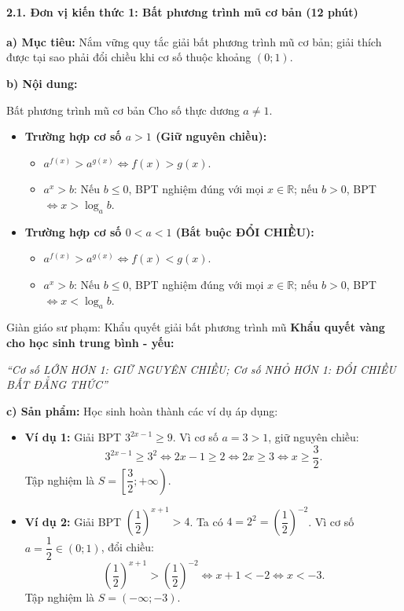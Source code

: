 \documentclass[12pt, a4paper]{article}
\begin{document}
\paragraph{2.1. Đơn vị kiến thức 1: Bất phương trình mũ cơ bản (12 phút)}

\noindent \textbf{a) Mục tiêu:}
Nắm vững quy tắc giải bất phương trình mũ cơ bản; giải thích được tại sao phải đổi chiều khi cơ số thuộc khoảng $(0; 1)$.

\noindent \textbf{b) Nội dung:}
\begin{pedabox}{Bất phương trình mũ cơ bản}
Cho số thực dương $a \neq 1$.
\begin{itemize}[leftmargin=0.6cm]
    \item \textbf{Trường hợp cơ số $a > 1$ (Giữ nguyên chiều):}
    \begin{itemize}
        \item $a^{f(x)} > a^{g(x)} \iff f(x) > g(x)$.
        \item $a^x > b$: Nếu $b \le 0$, BPT nghiệm đúng với mọi $x \in \mathbb{R}$; nếu $b > 0$, BPT $\iff x > \log_a b$.
    \end{itemize}
    \item \textbf{Trường hợp cơ số $0 < a < 1$ (Bắt buộc ĐỔI CHIỀU):}
    \begin{itemize}
        \item $a^{f(x)} > a^{g(x)} \iff f(x) < g(x)$.
        \item $a^x > b$: Nếu $b \le 0$, BPT nghiệm đúng với mọi $x \in \mathbb{R}$; nếu $b > 0$, BPT $\iff x < \log_a b$.
    \end{itemize}
\end{itemize}
\end{pedabox}

\begin{scaffoldbox}{Giàn giáo sư phạm: Khẩu quyết giải bất phương trình mũ}
\textbf{Khẩu quyết vàng cho học sinh trung bình - yếu:}
\begin{center}
\textit{``Cơ số LỚN HƠN 1: GIỮ NGUYÊN CHIỀU; Cơ số NHỎ HƠN 1: ĐỔI CHIỀU BẤT ĐẲNG THỨC''}
\end{center}
\end{scaffoldbox}

\noindent \textbf{c) Sản phẩm:}
Học sinh hoàn thành các ví dụ áp dụng:
\begin{itemize}
    \item \textbf{Ví dụ 1:} Giải BPT $3^{2x - 1} \ge 9$.
    Vì cơ số $a = 3 > 1$, giữ nguyên chiều:
    $$3^{2x - 1} \ge 3^2 \iff 2x - 1 \ge 2 \iff 2x \ge 3 \iff x \ge \dfrac{3}{2}.$$
    Tập nghiệm là $S = \left[\dfrac{3}{2}; +\infty\right)$.
    \item \textbf{Ví dụ 2:} Giải BPT $\left(\dfrac{1}{2}\right)^{x+1} > 4$.
    Ta có $4 = 2^2 = \left(\dfrac{1}{2}\right)^{-2}$.
    Vì cơ số $a = \dfrac{1}{2} \in (0; 1)$, đổi chiều:
    $$\left(\dfrac{1}{2}\right)^{x+1} > \left(\dfrac{1}{2}\right)^{-2} \iff x + 1 < -2 \iff x < -3.$$
    Tập nghiệm là $S = (-\infty; -3)$.
\end{itemize}
\end{document}
